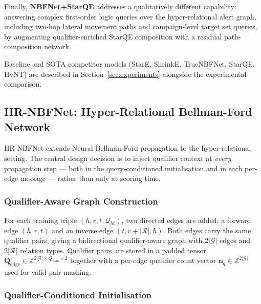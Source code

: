 \documentclass[10pt,journal,compsoc]{IEEEtran}
\begin{document}
Finally, \textbf{NBFNet+StarQE} addresses a qualitatively
different capability: answering complex first-order logic
queries over the hyper-relational alert graph, including
two-hop lateral movement paths and campaign-level target
set queries, by augmenting qualifier-enriched StarQE
composition with a residual path-composition network.

Baseline and SOTA competitor models
(StarE, ShrinkE, TrueNBFNet, StarQE, HyNT) are described
in Section~\ref{sec:experiments} alongside the experimental
comparison.

\subsection{HR-NBFNet: Hyper-Relational Bellman-Ford Network}
\label{ssec:hrnbfnet}

HR-NBFNet extends Neural Bellman-Ford propagation to the
hyper-relational setting.
The central design decision is to inject qualifier context
at \emph{every} propagation step — both in the
query-conditioned initialisation and in each per-edge
message — rather than only at scoring time.

\subsubsection{Qualifier-Aware Graph Construction}
\label{sssec:hr_graph}

For each training triple $(h, r, t, \mathcal{Q}_{ht})$,
two directed edges are added: a forward edge $(h, r, t)$
and an inverse edge $(t, r{+}|\mathcal{R}|, h)$.
Both edges carry the same qualifier pairs, giving a
bidirectional qualifier-aware graph with $2|\mathcal{G}|$
edges and $2|\mathcal{R}|$ relation types.
Qualifier pairs are stored in a padded tensor
$\mathbf{Q}_{\mathrm{edge}}
\in \mathbb{Z}^{2|\mathcal{G}| \times Q_{\max} \times 2}$
together with a per-edge qualifier count vector
$\mathbf{n}_q \in \mathbb{Z}^{2|\mathcal{G}|}$
used for valid-pair masking.

\subsubsection{Qualifier-Conditioned Initialisation}
\label{sssec:hr_init}
\end{document}
